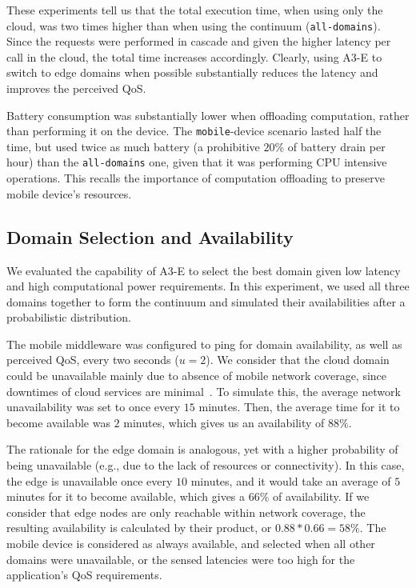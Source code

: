 These experiments tell us that the total execution time, when using only the cloud, was two times higher than when using the continuum (\texttt{all-domains}). Since the requests were performed in cascade and given the higher latency per call in the cloud, the total time increases accordingly. Clearly, using A3-E to switch to edge domains when possible substantially reduces the latency and improves the perceived QoS.

Battery consumption was substantially lower when offloading computation, rather than performing it on the device. The \texttt{mobile}-device scenario lasted half the time, but used twice as much battery (a prohibitive $20$\% of battery drain per hour) than the \texttt{all-domains} one, given that it was performing CPU intensive operations. This recalls the importance of computation offloading to preserve mobile device's resources.

\subsection{Domain Selection and Availability}
\label{sub:domain-selection}

We evaluated the capability of A3-E to select the best domain given low latency and high computational power requirements. In this experiment, we used all three domains together to form the continuum and simulated their availabilities after a probabilistic distribution. 

The mobile middleware was configured to ping for domain availability, as well as perceived QoS, every two seconds ($u = 2$). We consider that the cloud domain could be unavailable mainly due to absence of mobile network coverage, since downtimes of cloud services are minimal~\cite{garcia2017bandwidth}. To simulate this, the average network unavailability was set to once every $15$ minutes. Then, the average time for it to become available was $2$ minutes, which gives us an availability of $88\%$.

The rationale for the edge domain is analogous, yet with a higher probability of being unavailable (e.g., due to the lack of resources or connectivity). In this case, the edge is unavailable once every $10$ minutes, and it would take an average of $5$ minutes for it to become available, which gives a $66\%$ of availability. If we consider that edge nodes are only reachable within network coverage, the resulting availability is calculated by their product, or $0.88*0.66=58\%$. The mobile device is considered as always available, and selected when all other domains were unavailable, or the sensed latencies were too high for the application's QoS requirements. 

